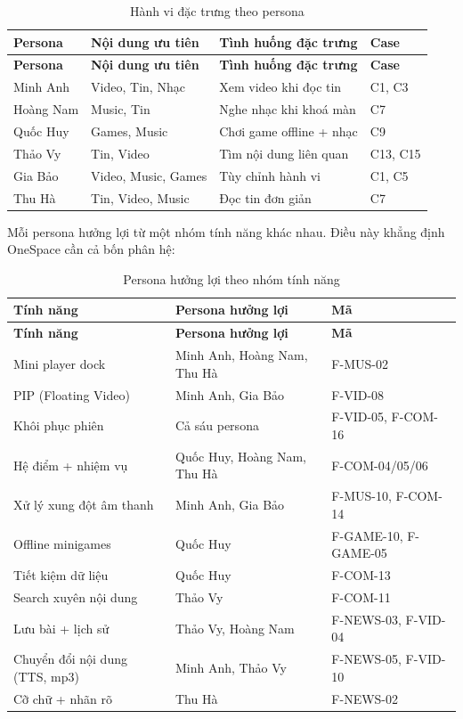 \begin{longtable}{>{\raggedright\arraybackslash}p{2.2cm} >{\raggedright\arraybackslash}p{3.4cm} >{\raggedright\arraybackslash}p{7.0cm} >{\raggedright\arraybackslash}p{2.4cm}}
\caption{Hành vi đặc trưng theo persona}
\label{tab:persona-behavior}\\
\toprule
\textbf{Persona} & \textbf{Nội dung ưu tiên} & \textbf{Tình huống đặc trưng} & \textbf{Case} \\
\midrule
\endfirsthead
\toprule
\textbf{Persona} & \textbf{Nội dung ưu tiên} & \textbf{Tình huống đặc trưng} & \textbf{Case} \\
\midrule
\endhead
\bottomrule
\endfoot
Minh Anh & Video, Tin, Nhạc & Xem video khi đọc tin & C1, C3 \\
Hoàng Nam & Music, Tin & Nghe nhạc khi khoá màn & C7 \\
Quốc Huy & Games, Music & Chơi game offline + nhạc & C9 \\
Thảo Vy & Tin, Video & Tìm nội dung liên quan & C13, C15 \\
Gia Bảo & Video, Music, Games & Tùy chỉnh hành vi & C1, C5 \\
Thu Hà & Tin, Video, Music & Đọc tin đơn giản & C7 \\
\end{longtable}

Mỗi persona hưởng lợi từ một nhóm tính năng khác nhau. Điều này khẳng định OneSpace cần cả bốn phân hệ:

\begin{longtable}{>{\raggedright\arraybackslash}p{3.8cm} >{\raggedright\arraybackslash}p{8.0cm} >{\raggedright\arraybackslash}p{3.2cm}}
\caption{Persona hưởng lợi theo nhóm tính năng}
\label{tab:persona-features}\\
\toprule
\textbf{Tính năng} & \textbf{Persona hưởng lợi} & \textbf{Mã} \\
\midrule
\endfirsthead
\toprule
\textbf{Tính năng} & \textbf{Persona hưởng lợi} & \textbf{Mã} \\
\midrule
\endhead
\bottomrule
\endfoot
Mini player dock & Minh Anh, Hoàng Nam, Thu Hà & F-MUS-02 \\
PIP (Floating Video) & Minh Anh, Gia Bảo & F-VID-08 \\
Khôi phục phiên & Cả sáu persona & F-VID-05, F-COM-16 \\
Hệ điểm + nhiệm vụ & Quốc Huy, Hoàng Nam, Thu Hà & F-COM-04/05/06 \\
Xử lý xung đột âm thanh & Minh Anh, Gia Bảo & F-MUS-10, F-COM-14 \\
Offline minigames & Quốc Huy & F-GAME-10, F-GAME-05 \\
Tiết kiệm dữ liệu & Quốc Huy & F-COM-13 \\
Search xuyên nội dung & Thảo Vy & F-COM-11 \\
Lưu bài + lịch sử & Thảo Vy, Hoàng Nam & F-NEWS-03, F-VID-04 \\
Chuyển đổi nội dung (TTS, mp3) & Minh Anh, Thảo Vy & F-NEWS-05, F-VID-10 \\
Cỡ chữ + nhãn rõ & Thu Hà & F-NEWS-02 \\
\end{longtable}

